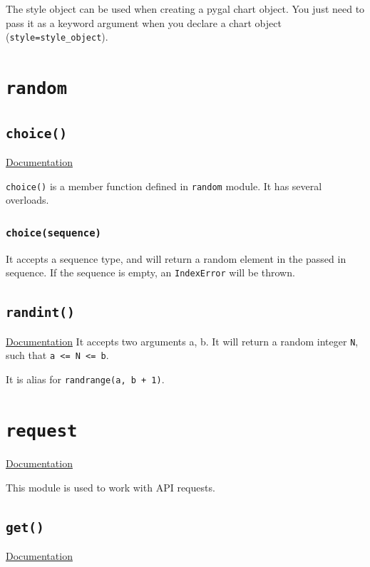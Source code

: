 \documentclass[12pt]{book}
\begin{document}
The style object can be used when creating a pygal chart object. You just need to pass it as a keyword argument when you declare a chart object (\texttt{style=style\_object}).

\chapter{\texttt{random}}
\label{sec:orgfbce4d9}
\section{\texttt{choice()}}
\label{sec:orge065020}
\href{https://docs.python.org/3/library/random.html\#random.choice}{Documentation}

\texttt{choice()} is a member function defined in \texttt{random} module. It has several overloads.

\subsection{\texttt{choice(sequence)} \label{orgf2e2287}}
\label{sec:org9798bbd}
It accepts a sequence type, and will return a random element in the passed in sequence. If the sequence is empty, an \texttt{IndexError} will be thrown.

\section{\texttt{randint()}}
\label{sec:orgdb9d678}
\href{https://docs.python.org/3/library/random.html\#random.randint}{Documentation}
It accepts two arguments a, b. It will return a random integer \texttt{N}, such that \texttt{a <= N <= b}.

It is alias for \texttt{randrange(a, b + 1)}.

\chapter{\texttt{request}}
\label{sec:orgdf1f726}
\href{https://2.python-requests.org/en/master/}{Documentation}

This module is used to work with API requests.

\section{\texttt{get()}}
\label{sec:orga542ed7}
\href{https://2.python-requests.org/en/master/api/\#requests.get}{Documentation}
\end{document}
